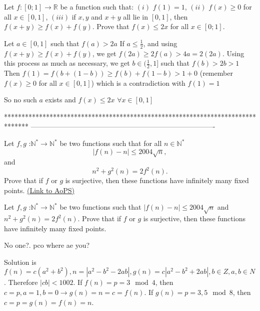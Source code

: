 \begin{solution}
	\begin{tcolorbox}Let $ f: [0;1] \rightarrow \mathbb{R}$ be a function such that:
$ (i)$ $ f(1) = 1$,
$ (ii)$ $ f(x) \ge 0$ for all $ x \in [0,1]$,
$ (iii)$ if $ x,y$ and $ x + y$ all lie in $ [0,1]$, then $ f(x + y) \ge f(x) + f(y)$.
Prove that $ f(x) \le 2x$ for all $ x \in [0;1]$.\end{tcolorbox}

Let $ a\in[0,1]$ such that $ f(a)>2a$
If $ a\leq\frac 12$, and using $ f(x + y) \ge f(x) + f(y)$, we get $ f(2a)\geq 2f(a) > 4a=2(2a)$. Using this process as much as necessary, we get $ b\in(\frac 12,1]$ such that $ f(b)>2b>1$
Then $ f(1)=f(b+(1-b))\ge f(b)+f(1-b)>1+0$ (remember $ f(x) \ge 0$ for all $ x \in [0,1]$) which is a contradiction with $ f(1)=1$

So no such $ a$ exists and $ f(x)\leq 2x$ $ \forall x\in[0,1]$
\end{solution}
*******************************************************************************
-------------------------------------------------------------------------------

\begin{problem}
	Let $ f,g$ :$ \mathbb N^* \to \mathbb N^*$ be two functions such that for all $n \in \mathbb N^*$ \[ |f(n)-n|\le 2004\sqrt n,\]  and \[ n^2+g^2(n)=2f^2(n).\] Prove that if $ f$ or $ g$ is surjective, then these functions have infinitely many fixed points.
	\flushright \href{https://artofproblemsolving.com/community/c6h281636}{(Link to AoPS)}
\end{problem}



\begin{solution}
	\begin{tcolorbox}Let $ f,g$ :$ \mathbb N^* \to \mathbb N^*$ be two functions such that $ |f(n) - n|\le 2004\sqrt n$
and $ n^2 + g^2(n) = 2f^2(n)$. Prove that if $ f$ or $ g$ is surjective, then these functions have infinitely many fixed points.\end{tcolorbox}
No one?. pco where ae you?
\end{solution}



\begin{solution}
	Solution is
$ f(n)=c(a^2+b^2),n=|a^2-b^2-2ab|,g(n)=c|a^2-b^2+2ab|, b\in Z, a,b\in N$.
Therefore $ |cb|<1002$. If $ f(n)=p=3\mod 4$, then $ c=p,a=1,b=0\to g(n)=n=c=f(n)$.
If $ g(n)=p=3,5\mod 8$, then $ c=p=g(n)=f(n)=n$.
\end{solution}



